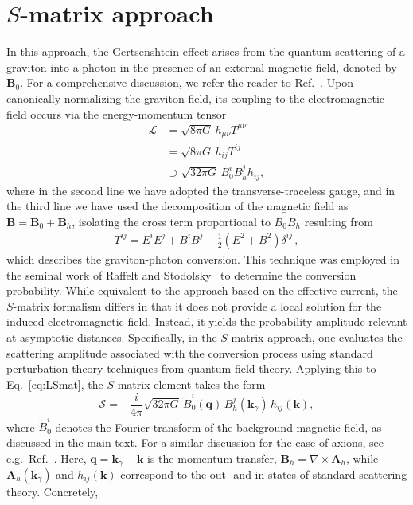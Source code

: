 \documentclass[a4paper,11pt]{article}
\begin{document}
\section{$S$-matrix approach}
\label{app:S-matrix}

In this approach, the Gertsenshtein effect arises from the quantum scattering of a graviton into a photon in the presence of an external magnetic field, denoted by ${\bm B}_0$. For a comprehensive discussion, we refer the reader to Ref.~\cite{DeLogi:1977qe}. Upon canonically normalizing the graviton field, its coupling to the electromagnetic field occurs via the energy-momentum tensor
%
\begin{equation}
\begin{aligned}
\label{eq:LSmat}
\mathcal{L} &= \sqrt{8\pi G} \, h_{\mu\nu} T^{\mu\nu}  \\
            &= \sqrt{8\pi G} \, h_{ij} T^{ij}  \\
            &\supset \sqrt{32\pi G} \, B_0^i B_h^j h_{ij},
\end{aligned}
\end{equation}
%
where in the second line we have adopted the transverse-traceless gauge, and in the third line we have used the decomposition of the magnetic field as ${\bm B} = {\bm B}_0 + {\bm B}_h$, isolating the cross term proportional to $B_0 B_h$ resulting from  
%
\begin{align}
    T^{ij} = E^i E^j + B^i B^j - \frac{1}{2} (E^2 + B^2) \delta^{ij} \,,
\end{align}
% 
which describes the graviton-photon conversion. 
This technique was employed in the seminal work of Raffelt and Stodolsky~\cite{Raffelt:1987im} to determine the conversion probability. While equivalent to the approach based on the effective current, the $S$-matrix formalism differs in that it does not provide a local solution for the induced electromagnetic field. Instead, it yields the probability amplitude relevant at asymptotic distances. 
Specifically, in the $S$-matrix approach, one evaluates the scattering amplitude associated with the conversion process using standard perturbation-theory techniques from quantum field theory. Applying this to Eq.~\eqref{eq:LSmat}, the $S$-matrix element takes the form
%
\begin{equation}
\mathcal{S} = - \frac{i}{4\pi} \sqrt{32 \pi G} \, \tilde{B}_0^i(\bm{q})\, B_h^j(\bm{k}_\gamma)\, h_{ij}(\bm{k}),
\end{equation}
%
where $\tilde{B}_0^i$ denotes the Fourier transform of the background magnetic field, as discussed in the main text. For a similar discussion for the case of axions, see e.g.\ Ref.~\cite{Raffelt:1987np}. Here, $\bm{q} = \bm{k}_\gamma - \bm{k}$ is the momentum transfer, $\bm{B}_h = \nabla \times \bm{A}_h$, while $\bm{A}_h (\bm{k}_\gamma)$ and $h_{ij}(\bm{k})$ correspond to the out- and in-states of standard scattering theory. Concretely, 
\end{document}
